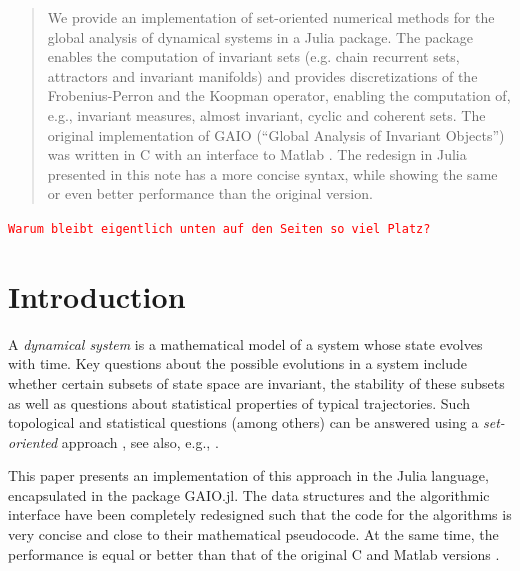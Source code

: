 \documentclass{juliacon}
\newcommand{\todo}[1]{\textcolor{red}{\texttt{#1}}}
\begin{document}


\maketitle

\vfill

\begin{abstract}

We provide an implementation of set-oriented numerical methods \cite{DeJu:02,DeFrJu:01} for the global analysis of dynamical systems in a Julia package. The package enables the computation of invariant sets (e.g. chain recurrent sets, attractors and invariant manifolds) and provides discretizations of the Frobenius-Perron and the Koopman operator, enabling the computation of, e.g., invariant measures, almost invariant, cyclic and coherent sets. The original implementation of GAIO (``Global Analysis of Invariant Objects'') was written in C with an interface to Matlab \cite{GAIO}. The redesign in Julia presented in this note has a more concise syntax, while showing the same or even better performance than the original version.

\end{abstract}

\todo{Warum bleibt eigentlich unten auf den Seiten so viel Platz?}

\section{Introduction}

A \emph{dynamical system} is a mathematical model of a system whose state evolves with time.  Key questions about the possible evolutions in a system  include whether certain subsets of state space are invariant, the stability of these subsets as well as questions about statistical properties of typical trajectories. Such topological and statistical questions (among others) can be answered using a \emph{set-oriented} approach \cite{DeJu:02,DeFrJu:01}, see also, e.g., \cite{Hsu:13,Mi:02}. 

This paper presents an implementation of this approach in the Julia language, encapsulated in the package GAIO.jl. The data structures and the algorithmic interface have been completely redesigned such that the code for the algorithms is very concise and close to their mathematical pseudocode. At the same time, the performance is equal or better than that of the original C and Matlab versions \cite{GAIO}.   
\end{document}
